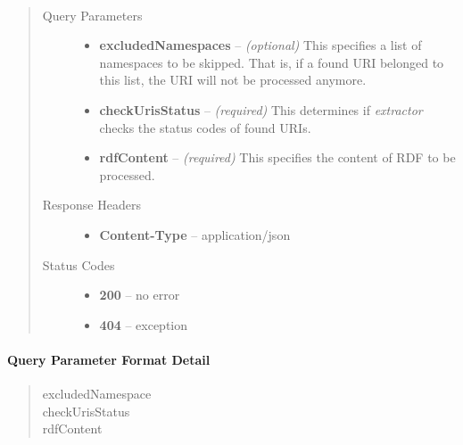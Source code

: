 \documentclass[letterpaper,10pt,english]{sphinxmanual}
\begin{document}
\begin{fulllineitems}
\label{docs/extractor:post--extractor_?excludedNamespaces, checkUrisStatus, rdfContent_}~\begin{quote}\begin{description}
\item[{Query Parameters}] \leavevmode\begin{itemize}
\item {} 
\textbf{excludedNamespaces} -- \emph{(optional)} This specifies a list of namespaces to be skipped. That is, if a found URI belonged to this list, the URI will not be processed anymore.

\item {} 
\textbf{checkUrisStatus} -- \emph{(required)} This determines if \emph{extractor} checks the status codes of found URIs.

\item {} 
\textbf{rdfContent} -- \emph{(required)} This specifies the content of RDF to be processed.

\end{itemize}

\item[{Response Headers}] \leavevmode\begin{itemize}
\item {} 
\textbf{Content-Type} -- application/json

\end{itemize}

\item[{Status Codes}] \leavevmode\begin{itemize}
\item {} 
\textbf{200} -- no error

\item {} 
\textbf{404} -- exception

\end{itemize}

\end{description}\end{quote}

\end{fulllineitems}



\paragraph{Query Parameter Format Detail}
\label{docs/extractor:query-parameter-format-detail}\begin{quote}\begin{description}
\item[{excludedNamespace}] \leavevmode
\item[{checkUrisStatus}] \leavevmode
\item[{rdfContent}] \leavevmode
\end{description}\end{quote}
\end{document}
